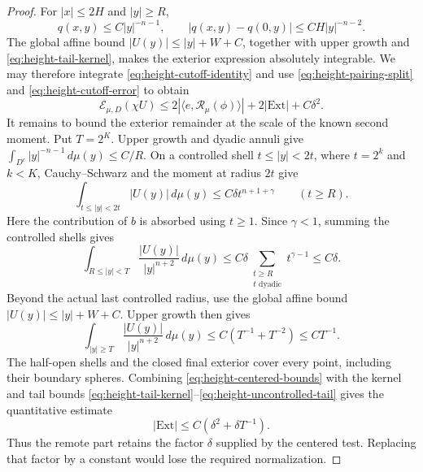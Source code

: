 \begin{proof}
For $|x|\le2H$ and $|y|\ge R$,
\begin{equation}
 q(x,y)\le C|y|^{-n-1},
 \qquad |q(x,y)-q(0,y)|\le CH|y|^{-n-2}.
 \label{eq:height-tail-kernel}
\end{equation}
The global affine bound $|U(y)|\le |y|+W+C$, together with upper
growth and \eqref{eq:height-tail-kernel}, makes the exterior expression
absolutely integrable.  We may therefore integrate
\eqref{eq:height-cutoff-identity} and use
\eqref{eq:height-pairing-split} and \eqref{eq:height-cutoff-error} to obtain
\begin{equation}
 \mathcal E_{\mu,D}(\chi U)
 \le 2|\langle e,\mathcal R_\mu(\phi)\rangle|
       +2|\mathrm{Ext}|+C\delta^2.
 \label{eq:height-energy-reduction}
\end{equation}
It remains to bound the exterior remainder at the scale of the known
second moment.  Put $T=2^K$.
Upper growth and dyadic annuli give
$\int_{D^c}|y|^{-n-1}\,d\mu(y)\le C/R$.
On a controlled shell $t\le |y|<2t$, where $t=2^k$ and $k<K$,
Cauchy--Schwarz and the moment at radius $2t$ give
\begin{equation}
 \int_{t\le|y|<2t}|U(y)|\,d\mu(y)
          \le C\delta t^{n+1+\gamma}
 \qquad(t\ge R).
 \label{eq:height-shell-first-moment}
\end{equation}
Here the contribution of $b$ is absorbed using $t\ge1$.
Since $\gamma<1$, summing the controlled shells gives
\begin{equation}
 \int_{R\le|y|<T}\frac{|U(y)|}{|y|^{n+2}}\,d\mu(y)
       \le C\delta\sum_{\substack{t\ge R\\t\text{ dyadic}}}t^{\gamma-1}
       \le C\delta.
 \label{eq:height-controlled-tail}
\end{equation}
Beyond the actual last controlled radius, use the global affine bound
$|U(y)|\le |y|+W+C$.  Upper growth then gives
\begin{equation}
 \int_{|y|\ge T}\frac{|U(y)|}{|y|^{n+2}}\,d\mu(y)
       \le C(T^{-1}+T^{-2})\le C T^{-1}.
 \label{eq:height-uncontrolled-tail}
\end{equation}
The half-open shells and the closed final exterior cover every point,
including their boundary spheres.  Combining
\eqref{eq:height-centered-bounds} with the kernel and tail bounds
\eqref{eq:height-tail-kernel}--\eqref{eq:height-uncontrolled-tail}
gives the quantitative estimate
\begin{equation}
 |\mathrm{Ext}|\le C(\delta^2+\delta T^{-1}).
 \label{eq:height-exterior-bound}
\end{equation}
Thus the remote part retains the factor $\delta$ supplied by the centered
test.  Replacing that factor by a constant would lose the required
normalization.


\end{proof}

